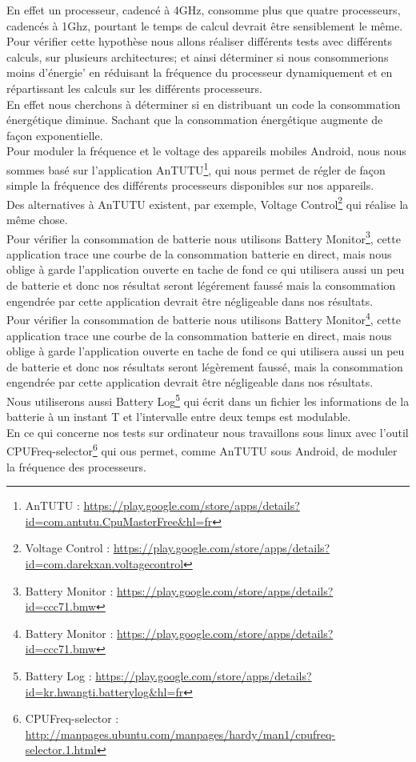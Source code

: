 	En effet un processeur, cadencé à 4GHz, consomme plus que quatre processeurs, cadencés à 1Ghz, pourtant le temps de calcul devrait être sensiblement le même. Pour vérifier cette hypothèse nous allons réaliser différents tests avec différents calculs, sur plusieurs architectures; et ainsi déterminer si nous consommerions moins d'énergie' en réduisant la fréquence du processeur dynamiquement et en répartissant les calculs sur les différents processeurs.\\

	En effet nous cherchons à déterminer si en distribuant un code la consommation énergétique diminue. Sachant que la consommation énergétique augmente de façon exponentielle.\\

	Pour moduler la fréquence et le voltage des appareils mobiles Android, nous nous sommes basé sur l'application AnTUTU\footnote{AnTUTU : \url{https://play.google.com/store/apps/details?id=com.antutu.CpuMasterFree&hl=fr}}, qui nous permet de régler de façon simple la fréquence des différents processeurs disponibles sur nos appareils.\\

	Des alternatives à AnTUTU existent, par exemple, Voltage Control\footnote{Voltage Control : \url{https://play.google.com/store/apps/details?id=com.darekxan.voltagecontrol}} qui réalise la même chose. \\

	Pour vérifier la consommation de batterie nous utilisons Battery Monitor\footnote{Battery Monitor : \url{https://play.google.com/store/apps/details?id=ccc71.bmw}}, cette application trace une courbe de la consommation batterie en direct, mais nous oblige à garde l'application ouverte en tache de fond ce qui utilisera aussi un peu de batterie et donc nos résultat seront légérement faussé mais la consommation engendrée par cette application devrait être négligeable dans nos résultats. \\

	Pour vérifier la consommation de batterie nous utilisons Battery Monitor\footnote{Battery Monitor : \url{https://play.google.com/store/apps/details?id=ccc71.bmw}}, cette application trace une courbe de la consommation batterie en direct, mais nous oblige à garde l'application ouverte en tache de fond ce qui utilisera aussi un peu de batterie et donc nos résultats seront légèrement faussé, mais la consommation engendrée par cette application devrait être négligeable dans nos résultats. \\

	Nous utiliserons aussi Battery Log\footnote{Battery Log : \url{https://play.google.com/store/apps/details?id=kr.hwangti.batterylog&hl=fr}} qui écrit dans un fichier les informations de la batterie à un instant T et l'intervalle entre deux temps est modulable.\\

	En ce qui concerne nos tests sur ordinateur nous travaillons sous linux avec l'outil CPUFreq-selector\footnote{CPUFreq-selector : \url{http://manpages.ubuntu.com/manpages/hardy/man1/cpufreq-selector.1.html}} qui ous permet, comme AnTUTU sous Android, de moduler la fréquence des processeurs.\\
